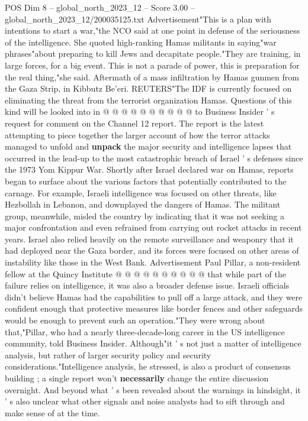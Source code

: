 \begin{textsample}{POS Dim 8 – global\_north\_2023\_12 – Score 3.00 – global\_north\_2023\_12/200035125.txt}
Advertisement"This is a plan with intentions to start a war,"the NCO said at one point in defense of the seriousness of the intelligence.
She quoted high-ranking Hamas militants in saying"war phrases"about preparing to kill Jews and decapitate people."They are training, in large forces, for a big event.
This is not a parade of power, this is preparation for the real thing,"she said.
Aftermath of a mass infiltration by Hamas gunmen from the Gaza Strip, in Kibbutz Be'eri.
REUTERS"The IDF is currently focused on eliminating the threat from the terrorist organization Hamas.
Questions of this kind will be looked into in @ @ @ @ @ @ @ @ @ @ to Business Insider ' s request for comment on the Channel 12 report.
The report is the latest attempting to piece together the larger account of how the terror attacks managed to unfold and \textbf{unpack} the major security and intelligence lapses that occurred in the lead-up to the most catastrophic breach of Israel ' s defenses since the 1973 Yom Kippur War.
Shortly after Israel declared war on Hamas, reports began to surface about the various factors that potentially contributed to the carnage.
For example, Israeli intelligence was focused on other threats, like Hezbollah in Lebanon, and downplayed the dangers of Hamas.
The militant group, meanwhile, misled the country by indicating that it was not seeking a major confrontation and even refrained from carrying out rocket attacks in recent years.
Israel also relied heavily on the remote surveillance and weaponry that it had deployed near the Gaza border, and its forces were focused on other areas of instability like those in the West Bank.
Advertisement Paul Pillar, a non-resident fellow at the Quincy Institute @ @ @ @ @ @ @ @ @ @ that while part of the failure relies on intelligence, it was also a broader defense issue.
Israeli officials didn't believe Hamas had the capabilities to pull off a large attack, and they were confident enough that protective measures like border fences and other safeguards would be enough to prevent such an operation."They were wrong about that,"Pillar, who had a nearly three-decade-long career in the US intelligence community, told Business Insider.
Although"it ' s not just a matter of intelligence analysis, but rather of larger security policy and security considerations."Intelligence analysis, he stressed, is also a product of consensus building ; a single report won't \textbf{necessarily} change the entire discussion overnight.
And beyond what ' s been revealed about the warnings in hindsight, it ' s also unclear what other signals and noise analysts had to sift through and make sense of at the time.

\end{textsample}

